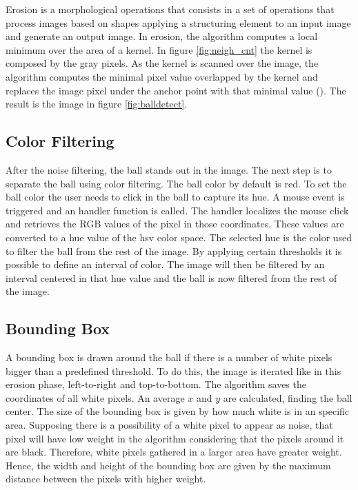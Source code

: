 Erosion is a morphological operations that consists in a set of operations that process images based on shapes applying a structuring element to an input image and generate an output image. In erosion, the algorithm computes a local minimum over the area of a kernel. In figure \ref{fig:neigh_cnt} the kernel is composed by the gray pixels. As the kernel is scanned over the image, the algorithm computes the minimal pixel value overlapped by the kernel and replaces the image pixel under the anchor point with that minimal value (\cite{OpenCV2.4.13.6documentation}). The result is the image in figure \ref{fig:balldetect}.

\subsection{Color Filtering}

After the noise filtering, the ball stands out in the image. The next step is to separate the ball using color filtering. The ball color by default is red. To set the ball color the user needs to click in the ball to capture its hue. A mouse event is triggered and an handler function is called. The handler localizes the mouse click and retrieves the RGB values of the pixel in those coordinates. These values are converted to a hue value of the \gls{hsv} color space. The selected hue is the color used to filter the ball from the rest of the image. By applying certain thresholds it is possible to define an interval of color. The image will then be filtered by an interval centered in that hue value and the ball is now filtered from the rest of the image. 


\subsection{Bounding Box}

A bounding box is drawn around the ball if there is a number of white pixels bigger than a predefined threshold. To do this, the image is iterated like in this erosion phase, left-to-right and top-to-bottom. The algorithm saves the coordinates of all white pixels. An average $x$ and $y$ are calculated, finding the ball center. The size of the bounding box is given by how much white is in an specific area. Supposing there is a possibility of a white pixel to appear as noise, that pixel will have low weight in the algorithm considering that the pixels around it are black. Therefore, white pixels gathered in a larger area have greater weight. Hence, the width and height of the bounding box are given by the maximum distance between the pixels with higher weight.


